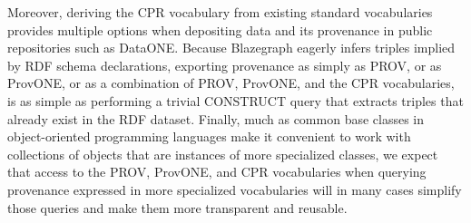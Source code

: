 Moreover, deriving the CPR vocabulary from existing standard vocabularies provides multiple options when depositing data and its provenance in public repositories such as DataONE. Because Blazegraph eagerly infers triples implied by RDF schema declarations, exporting provenance as simply as PROV, or as ProvONE, or as a combination of PROV, ProvONE, and the CPR vocabularies, is as simple as performing a trivial CONSTRUCT query that extracts triples that already exist in the RDF dataset. Finally, much as common base classes in object-oriented programming languages make it convenient to work with collections of objects that are instances of more specialized classes, we expect that access to the PROV, ProvONE, and CPR vocabularies when querying provenance expressed in more specialized vocabularies will in many cases simplify those queries and make them more transparent and reusable.



